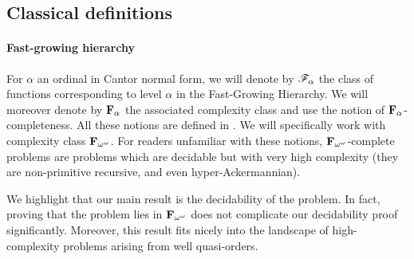 %	
%	


\subsection{Classical definitions}


\paragraph*{Fast-growing hierarchy}

For $\alpha$ an ordinal in Cantor normal form, we will denote by $\mathscr{F}_{\alpha}$ the class of functions corresponding to level $\alpha$ in the Fast-Growing Hierarchy. We will moreover denote by $\mathbf{F}_{\alpha}$ the associated complexity class and use the notion of $\mathbf{F}_{\alpha}$-completeness. All these notions are defined in \cite{Schmitz16}. We will specifically work with complexity class $\mathbf{F}_{\omega^{\omega}}$. For readers unfamiliar with these notions, $\mathbf{F}_{\omega^{\omega}}$-complete problems are problems which are decidable but with very high complexity (they are non-primitive recursive, and even hyper-Ackermannian). 

We highlight that our main result is the decidability of the problem. In fact, proving that the problem lies in $\mathbf{F}_{\omega^{\omega}}$ does not complicate our decidability proof significantly. Moreover, this result fits nicely into the landscape of high-complexity problems arising from well quasi-orders. 

